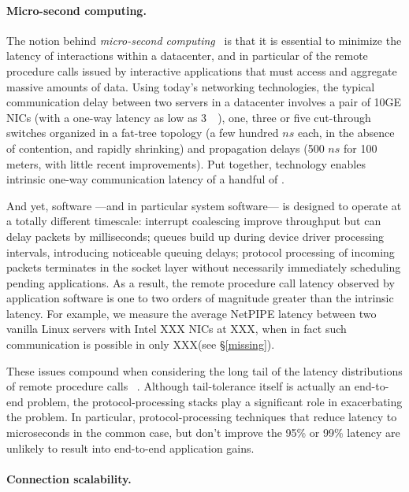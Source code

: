 \paragraph{Micro-second computing.}

The notion behind \emph{micro-second computing}~\cite{luiz-isscc} is
that it is essential to minimize the latency of interactions within a
datacenter, and in particular of the remote procedure calls issued by
interactive applications that must access and aggregate massive
amounts of data.  Using today's networking technologies, the typical
communication delay between two servers in a datacenter involves a
pair of 10GE NICs (with a one-way latency as low as
3~\microsecond~\cite{cisco-sereno}), one, three or five cut-through
switches organized in a fat-tree topology (a few hundred $ns$ each, in
the absence of contention, and rapidly shrinking) and propagation
delays (500 $ns$ for 100 meters, with little recent improvements).
Put together, technology enables intrinsic one-way communication
latency of a handful of \microsecond.  

And yet, software ---and in particular system software--- is designed
to operate at a totally different timescale: interrupt coalescing
improve throughput but can delay packets by milliseconds; queues build
up during device driver processing intervals, introducing noticeable
queuing delays; protocol processing of incoming packets terminates in
the socket layer without necessarily immediately scheduling pending
applications. As a result, the remote procedure call latency observed
by application software is one to two orders of magnitude greater than
the intrinsic latency.  For example, we measure the average NetPIPE
latency between two vanilla Linux servers with Intel XXX NICs at
XXX\microsecond, when in fact such communication is possible in only
XXX\microsecond (see \S\ref{missing}).

These issues compound when considering the long tail of the latency
distributions of remote procedure
calls~\cite{DBLP:journals/cacm/DeanB13} . Although tail-tolerance
itself is actually an end-to-end problem, the protocol-processing
stacks play a significant role in exacerbating the problem.  In
particular, protocol-processing techniques that reduce latency to
microseconds in the common case, but don't improve the 95\% or 99\%
latency are unlikely to result into end-to-end application gains.

\paragraph{Connection scalability.}

